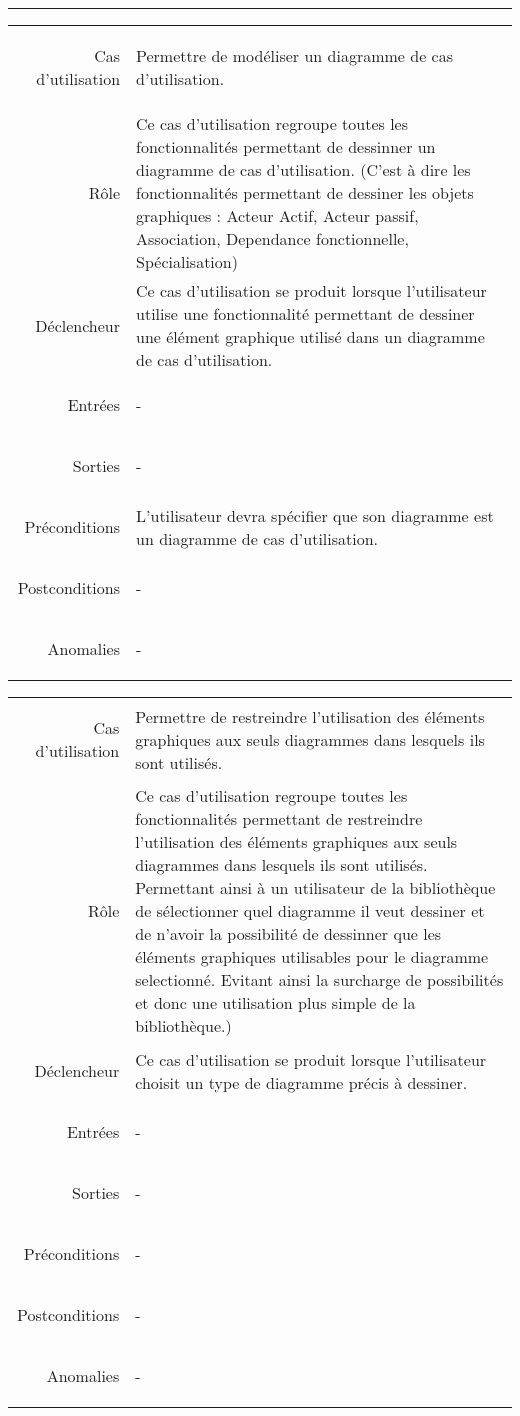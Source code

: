 \documentclass[12pt,a4paper,openany]{report}
\begin{document}
	\begin{center}
	\rule{12.6cm}{.5pt}
	\end{center}
	\begin{longtable}{>{\begin{bf}} r <{\end{bf}}!{:}p{13.5cm}}
	Cas d'utilisation & Permettre de modéliser un diagramme de cas d'utilisation.\\
	Rôle & Ce cas d'utilisation regroupe toutes les fonctionnalités permettant de dessinner un diagramme de cas d'utilisation.
	(C'est à dire les fonctionnalités permettant de dessiner les objets graphiques : Acteur Actif, Acteur passif, Association,
	Dependance fonctionnelle, Spécialisation)\\
	Déclencheur & Ce cas d'utilisation se produit lorsque l'utilisateur utilise une fonctionnalité permettant de dessiner une
	élément graphique utilisé dans un diagramme de cas d'utilisation.\\
	Entrées & -\\
	Sorties & -\\
	Préconditions & L'utilisateur devra spécifier que son diagramme est un diagramme de cas d'utilisation.\\
	Postconditions & -\\
	Anomalies & -\\
	\end{longtable}
	\begin{longtable}{>{\begin{bf}} r <{\end{bf}}!{:}p{13.5cm}}
	Cas d'utilisation & Permettre de restreindre l'utilisation des éléments graphiques aux seuls diagrammes dans lesquels ils sont utilisés.\\
	Rôle & Ce cas d'utilisation regroupe toutes les fonctionnalités permettant de restreindre l'utilisation des éléments
	graphiques aux seuls diagrammes dans lesquels ils sont utilisés. Permettant ainsi à un utilisateur de la bibliothèque de sélectionner quel
	diagramme il veut dessiner et de n'avoir la possibilité de dessinner que les éléments graphiques utilisables pour le diagramme selectionné.
	Evitant ainsi la surcharge de possibilités et donc une utilisation plus simple de la bibliothèque.)\\
	Déclencheur & Ce cas d'utilisation se produit lorsque l'utilisateur choisit un type de diagramme précis à dessiner.\\
	Entrées & -\\
	Sorties & -\\
	Préconditions & -\\
	Postconditions & -\\
	Anomalies & -\\
	\end{longtable}
\end{document}
